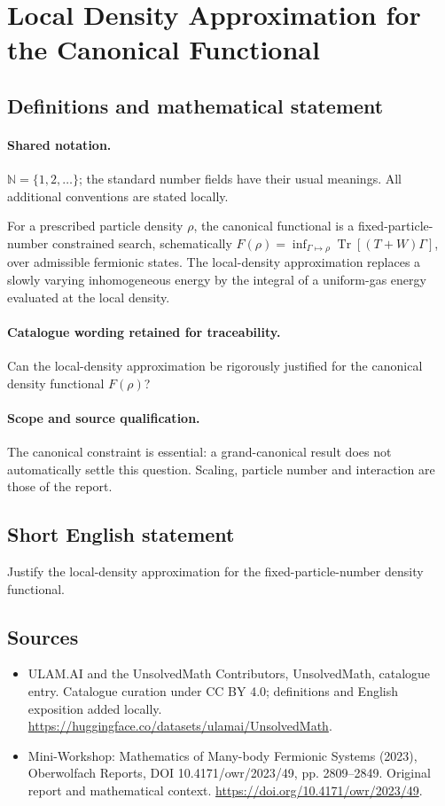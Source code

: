 \documentclass[11pt]{article}
\begin{document}
\section{Local Density Approximation for the Canonical Functional}\label{statement}

\subsection{Definitions and mathematical statement}

\paragraph{Shared notation.}$\mathbb N=\{1,2,\ldots\}$; the standard number fields have their usual meanings. All additional conventions are stated locally.


For a prescribed particle density $\rho$, the canonical functional is a fixed-particle-number constrained search, schematically $F(\rho)=\inf_{\Gamma\mapsto\rho}\operatorname{Tr}[(T+W)\Gamma]$, over admissible fermionic states. The local-density approximation replaces a slowly varying inhomogeneous energy by the integral of a uniform-gas energy evaluated at the local density.

\paragraph{Catalogue wording retained for traceability.}
Can the local-density approximation be rigorously justified for the canonical density functional $F(\rho)$?

\paragraph{Scope and source qualification.}The canonical constraint is essential: a grand-canonical result does not automatically settle this question. Scaling, particle number and interaction are those of the report.
\subsection{Short English statement}
Justify the local-density approximation for the fixed-particle-number density functional.
\subsection{Sources}
\begin{itemize}
\item[\hypertarget{source:statement:1}{S1}] ULAM.AI and the UnsolvedMath Contributors, UnsolvedMath, catalogue entry. Catalogue curation under CC BY 4.0; definitions and English exposition added locally.
\url{https://huggingface.co/datasets/ulamai/UnsolvedMath}.
\item[\hypertarget{source:statement:2}{S2}] Mini-Workshop: Mathematics of Many-body Fermionic Systems (2023), Oberwolfach Reports, DOI 10.4171/owr/2023/49, pp. 2809--2849. Original report and mathematical context.
\url{https://doi.org/10.4171/owr/2023/49}.
\end{itemize}
\label{end:statement}
\end{document}
